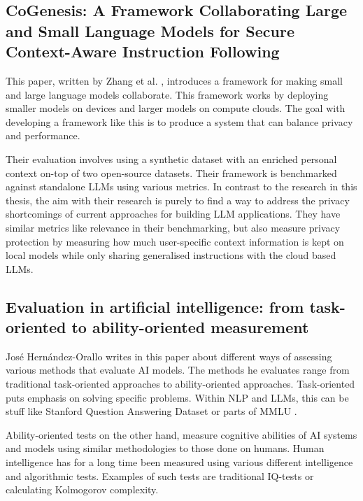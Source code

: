 \subsection{CoGenesis: A Framework Collaborating Large and Small Language
Models for Secure Context-Aware Instruction Following}


This paper, written by Zhang et al. \cite{zhang_cogenesis_2024}, introduces a framework for making small and large language models collaborate. This framework works by deploying smaller models on devices and larger models on compute clouds. The goal with developing a framework like this is to produce a system that can balance privacy and performance.


Their evaluation involves using a synthetic dataset with an enriched personal context on-top of two open-source datasets. Their framework is benchmarked against standalone \gls{LLM}s using various metrics. In contrast to the research in this thesis, the aim with their research is purely to find a way to address the privacy shortcomings of current approaches for building \gls{LLM} applications. They have similar metrics like relevance in their benchmarking, but also measure privacy protection by measuring how much user-specific context information is kept on local models while only sharing generalised instructions with the cloud based \gls{LLM}s.


\subsection{Evaluation in artificial intelligence: from task-oriented to ability-oriented measurement}


José Hernández-Orallo \cite{hernandez-orallo_evaluation_2017} writes in this paper about different ways of assessing various methods that evaluate AI models. The methods he evaluates range from traditional task-oriented approaches to ability-oriented approaches. Task-oriented puts emphasis on solving specific problems. Within \gls{NLP} and \gls{LLM}s, this can be stuff like Stanford Question Answering Dataset \cite{rajpurkar_squad_2016} or parts of \gls{MMLU} \cite{hendrycks_measuring_2021}.


Ability-oriented tests on the other hand, measure cognitive abilities of AI systems and models using similar methodologies to those done on humans. Human intelligence has for a long time been measured using various different intelligence and algorithmic tests. Examples of such tests are traditional IQ-tests or calculating Kolmogorov complexity.


